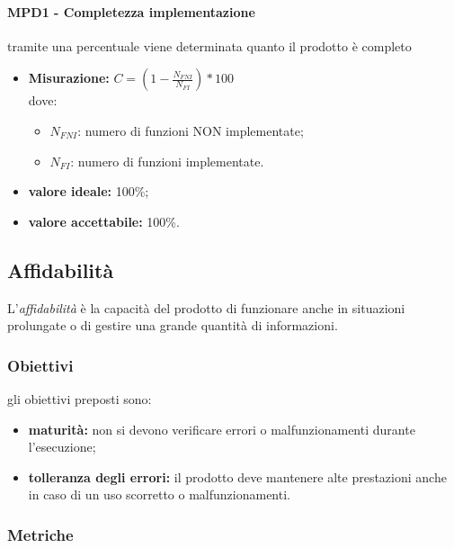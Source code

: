 \paragraph{MPD1 - Completezza implementazione} tramite una percentuale viene determinata quanto il prodotto è completo
\begin{itemize}
	\item \textbf{Misurazione:} \begin{math}C=\left(1-\frac{N_{FNI}}{N_{FI}}\right)*100\end{math}\\
	dove:
	\begin {itemize}
		\item \begin{math}N_{FNI}\end{math}: numero di funzioni NON implementate;
		\item \begin{math}N_{FI}\end{math}: numero di funzioni implementate.
	\end{itemize}
	\item \textbf{valore ideale:} 100\%;
	\item \textbf{valore accettabile:} 100\%.
\end{itemize}

\subsection{Affidabilità}
L'\textit{affidabilità} è la capacità del prodotto di funzionare anche in situazioni prolungate o di gestire una grande quantità di informazioni.
\subsubsection{Obiettivi}
gli obiettivi preposti sono:
\begin {itemize}
	\item \textbf{maturità:} non si devono verificare errori o malfunzionamenti durante l'esecuzione;
	\item \textbf{tolleranza degli errori:} il prodotto deve mantenere alte prestazioni anche in caso di un uso scorretto o malfunzionamenti.
\end{itemize}
\subsubsection{Metriche}

